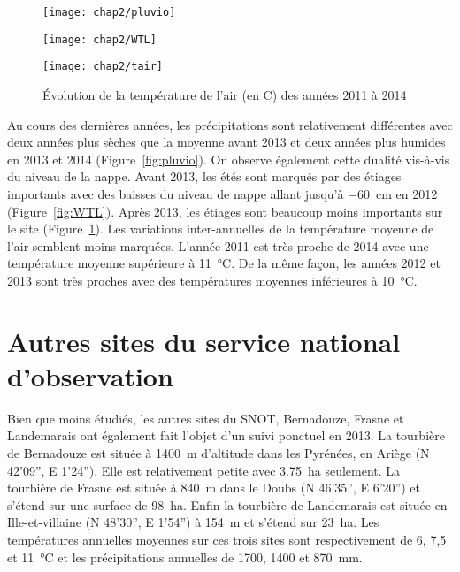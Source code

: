 \begin{figure}
\centering
\texttt{[image: chap2/pluvio]}\\
\caption{Évolution du niveau de la pluviométrie, en \si{\mm}, des années 2011 à 2014}
\label{fig:pluvio}
\texttt{[image: chap2/WTL]}\\
\caption{Évolution du niveau de la nappe, en cm par rapport à la surface, des années 2011 à 2014}
\label{fig:WTL}
\texttt{[image: chap2/tair]}
\caption{Évolution de la température de l'air (en \textdegree C) des années 2011 à 2014}
\label{fig:tair}
\end{figure}

Au cours des dernières années, les précipitations sont relativement différentes avec deux années plus sèches que la moyenne avant 2013 et deux années plus humides en 2013 et 2014 (Figure~\ref{fig:pluvio}).
On observe également cette dualité vis-à-vis du niveau de la nappe.
Avant 2013, les étés sont marqués par des étiages importants avec des baisses du niveau de nappe allant jusqu'à \SI{-60}{\cm} en 2012 (Figure~\ref{fig:WTL}).
Après 2013, les étiages sont beaucoup moins importants sur le site (Figure~\ref{fig:tair}).
Les variations inter-annuelles de la température moyenne de l'air semblent moins marquées.
L'année 2011 est très proche de 2014 avec une température moyenne supérieure à \SI{11}{\degreeCelsius}.
De la même façon, les années 2012 et 2013 sont très proches avec des températures moyennes inférieures à  \SI{10}{\degreeCelsius}.


\singlespacing
\section{Autres sites du service national d'observation}
\onehalfspacing

Bien que moins étudiés, les autres sites du SNOT, Bernadouze, Frasne et Landemarais ont également fait l'objet d'un suivi ponctuel en 2013.
La tourbière de Bernadouze est située à \SI{1400}{\metre} d'altitude dans les Pyrénées, en Ariège (N 42’09”, E 1’24”).
Elle est relativement petite avec \SI{3.75}{\hectare} seulement.
La tourbière de Frasne est située à \SI{840}{\metre} dans le Doubs (N 46’35”, E 6’20”) et s'étend sur une surface de \SI{98}{\hectare}.
Enfin la tourbière de Landemarais est située en Ille-et-villaine (N 48’30”, E 1’54”) à \SI{154}{\metre} et s'étend sur \SI{23}{\hectare}.
Les températures annuelles moyennes sur ces trois sites sont respectivement de 6, 7,5 et \SI{11}{\degreeCelsius} et les précipitations annuelles de \num{1700}, \num{1400} et \SI{870}{\milli\meter}.

